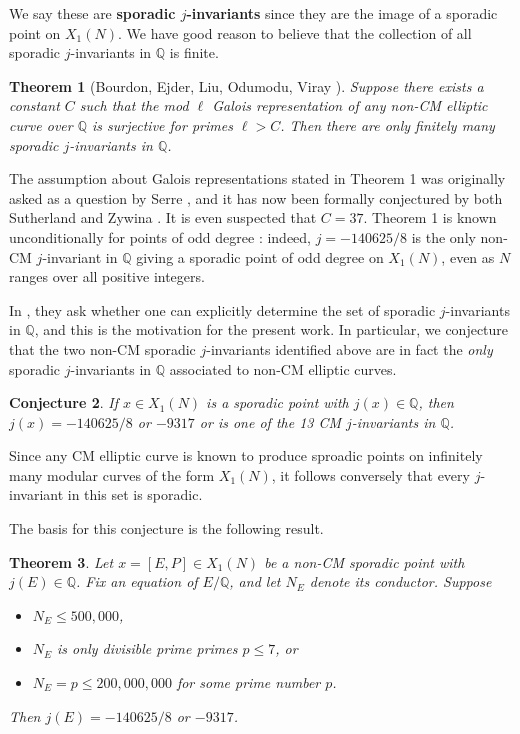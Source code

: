 \documentclass[11pt,reqno]{amsart}
\theoremstyle{plain}
\newtheorem{theorem}{Theorem}%
\newtheorem{conjecture}[theorem]{Conjecture}
\theoremstyle{definition}
\newcommand{\Q}{\mathbb{Q}}
\begin{document}
We say these are \textbf{sporadic $j$-invariants} since they are the image of a sporadic point on $X_1(N)$. We have good reason to believe that the collection of all sporadic $j$-invariants in $\Q$ is finite.
\begin{theorem}[Bourdon, Ejder, Liu, Odumodu, Viray \cite{BELOV}]
Suppose there exists a constant $C$ such that the mod $\ell$ Galois representation of any non-CM elliptic curve over $\Q$ is surjective for primes $\ell>C$. Then there are only finitely many sporadic $j$-invariants in $\Q$.
\end{theorem}

\noindent The assumption about Galois representations stated in Theorem 1 was originally asked as a question by Serre \cite{serre72}, and it has now been formally conjectured by both Sutherland \cite{sutherland} and Zywina \cite{ZywinaImages}. It is even suspected that $C=37$. Theorem 1 is known unconditionally for points of odd degree \cite{OddDeg}: indeed, $j=-140625/8$ is the only non-CM $j$-invariant in $\Q$ giving a sporadic point of odd degree on $X_1(N)$, even as $N$ ranges over all positive integers. 

In \cite{BELOV}, they ask whether one can explicitly determine the set of sporadic $j$-invariants in $\Q$, and this is the motivation for the present work. In particular, we conjecture that the two non-CM sporadic $j$-invariants identified above are in fact the \emph{only} sporadic $j$-invariants in $\Q$ associated to non-CM elliptic curves. 

\begin{conjecture}
If $x\in X_1(N)$ is a sporadic point with $j(x) \in \Q$, then $j(x)=-140625/8$ or $-9317$ or is one of the 13 CM $j$-invariants in $\Q$. 
\end{conjecture}

\noindent Since any CM elliptic curve is known to produce sproadic points on infinitely many modular curves of the form $X_1(N)$, it follows conversely that every $j$-invariant in this set is sporadic.

The basis for this conjecture is the following result.

\begin{theorem}
Let $x=[E,P]\in X_1(N)$ be a non-CM sporadic point with $j(E) \in \Q$. Fix an equation of $E/\Q$, and let $N_E$ denote its conductor. Suppose
\begin{itemize}
\item$N_E \leq 500,000$,
\item $N_E$ is only divisible prime primes $p \leq 7$, or
\item $N_E=p \leq 200,000,000$ for some prime number $p$.
\end{itemize}
Then $j(E) =-140625/8$ or $-9317$.
\end{theorem}
\end{document}
